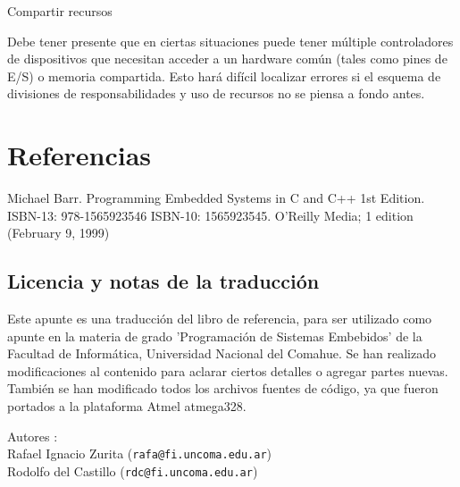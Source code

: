 \documentclass[12pt]{article}
\begin{document}
Compartir recursos

Debe tener presente que en ciertas situaciones puede tener múltiple
controladores de dispositivos que necesitan acceder a un hardware común 
(tales como pines de E/S) o memoria compartida.
Esto hará difícil localizar errores si el
esquema de divisiones de responsabilidades y uso de recursos
no se piensa a fondo antes.





\section*{Referencias}

Michael Barr. Programming Embedded Systems in C and C++ 1st Edition. ISBN-13: 978-1565923546
ISBN-10: 1565923545. O'Reilly Media; 1 edition (February 9, 1999)

\subsection*{Licencia y notas de la traducción}

Este apunte es una traducción del libro de referencia, para
ser utilizado como apunte en la materia de grado
'Programación de Sistemas Embebidos' de la Facultad de Informática,
Universidad Nacional del Comahue.
Se han realizado modificaciones
al contenido para aclarar ciertos detalles o agregar partes nuevas.
 También se han
modificado todos los archivos fuentes de código, ya que fueron
portados a la plataforma Atmel atmega328.

Autores : \\
Rafael Ignacio Zurita ({\tt rafa@fi.uncoma.edu.ar}) \\
Rodolfo del Castillo ({\tt rdc@fi.uncoma.edu.ar})




\end{document}
